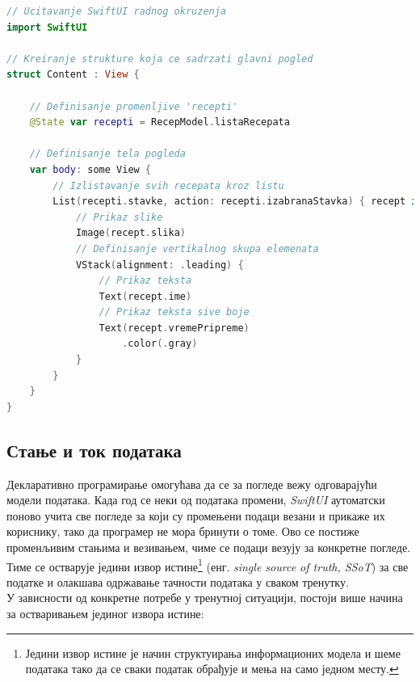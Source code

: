 \documentclass[12pt,oneside]{memoir}
\begin{document}
\begin{lstlisting}[caption=\textit{{Пример SwiftUI кода}}, label={lst:Пример SwiftUI кода}, language=Swift, frame=single]
// Ucitavanje SwiftUI radnog okruzenja
import SwiftUI

// Kreiranje strukture koja ce sadrzati glavni pogled
struct Content : View {

    // Definisanje promenljive 'recepti'
    @State var recepti = RecepModel.listaRecepata
    
    // Definisanje tela pogleda
    var body: some View {
        // Izlistavanje svih recepata kroz listu
        List(recepti.stavke, action: recepti.izabranaStavka) { recept in
            // Prikaz slike
            Image(recept.slika)
            // Definisanje vertikalnog skupa elemenata
            VStack(alignment: .leading) {
                // Prikaz teksta
                Text(recept.ime)
                // Prikaz teksta sive boje
                Text(recept.vremePripreme)
                    .color(.gray)
            }
        }
    } 
}
\end{lstlisting}

\subsection{Стање и ток података}
\label{subsec:Стање и ток података}

\indent Декларативно програмирање омогућава да се за погледе вежу одговарајући модели података. Када год се неки од података промени, \textit{SwiftUI} аутоматски поново учита све погледе за који су промењени подаци везани и прикаже их кориснику, тако да програмер не мора бринути о томе. Ово се постиже променљивим стањима и везивањем, чиме се подаци везују за конкретне погледе. Тиме се остварује једини извор истине\footnote{Једини извор истине је начин структуирања информационих модела и шеме података тако да се сваки податак обрађује и мења на само једном месту.} (енг. \textit{single source of truth, SSoT}) за све податке и олакшава одржавање тачности података у сваком тренутку. 
\\
\indent У зависности од конкретне потребе у тренутној ситуацији, постоји више начина за остваривањем јединог извора истине:
\end{document}
